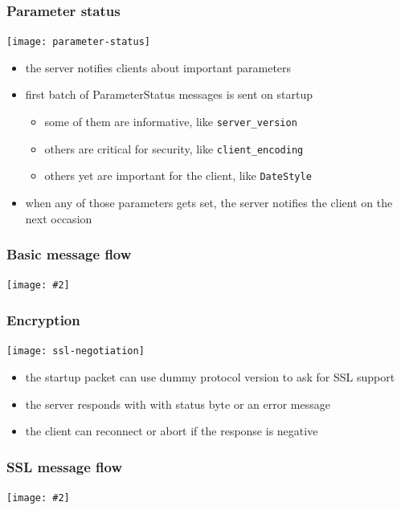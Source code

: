 \documentclass{beamer}
\newcommand{\mscdiagram}[2][1]{
  \begin{center}
    \texttt{[image: \#2]}
  \end{center}
}
\begin{document}
\begin{frame}
  \frametitle{Parameter status}

  \begin{center}
    \texttt{[image: parameter-status]}
  \end{center}

  \begin{itemize}
  \item the server notifies clients about important parameters
  \item first batch of ParameterStatus messages is sent on startup
    \begin{itemize}
    \item some of them are \alert{informative}, like \texttt{server\_version}
    \item others are critical for \alert{security}, like \texttt{client\_encoding}
    \item others yet are important for the \alert{client}, like \texttt{DateStyle}
    \end{itemize}
  \item when any of those parameters gets set, the server notifies the client
    on the next occasion
  \end{itemize}
\end{frame}

\begin{frame}
  \frametitle{Basic message flow}

  \mscdiagram{basic-message-flow}
\end{frame}

\begin{frame}
  \frametitle{Encryption}

  \begin{center}
    \texttt{[image: ssl-negotiation]}
  \end{center}

  \begin{itemize}
  \item the startup packet can use \alert{dummy protocol version} to ask for
    SSL support
  \item the server responds with with \alert{status byte} or an error message
  \item the client can reconnect or abort if the response is negative
  \end{itemize}
\end{frame}

\begin{frame}
  \frametitle{SSL message flow}

  \mscdiagram{ssl-message-flow}
\end{frame}
\end{document}
